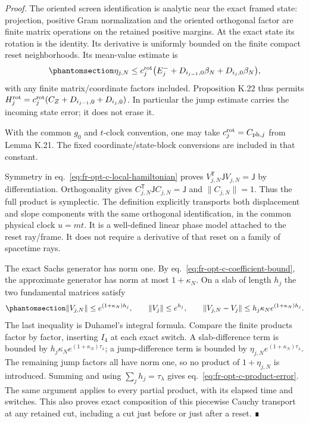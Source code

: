 \documentclass[
  english,
  11pt,
  reqno]{amsart}
\begin{document}
\emph{Proof.} The oriented screen identification is analytic near the
exact framed state: projection, positive Gram normalization and the
oriented orthogonal factor are finite matrix operations on the retained
positive margins. At the exact state its rotation is the identity. Its
derivative is uniformly bounded on the finite compact reset
neighborhoods. Its mean-value estimate is
\begin{equation}\protect\phantomsection\label{eq:fr-opt-c-rotation-input-error}{
 \eta_{j,N}\le c_j^{\rm rot}
    \bigl(E_j^-+D_{i_{j-1},0}\beta_N+D_{i_j,0}\beta_N\bigr),
}\end{equation} with any finite matrix/coordinate factors included.
Proposition K.22 thus permits
\(H_j^{\rm rot}=c_j^{\rm rot}(C_Z+D_{i_{j-1},0}+D_{i_j,0})\). In
particular the jump estimate carries the incoming state error; it does
not erase it.

With the common \(g_0\) and \(t\)-clock convention, one may take
\(c_j^{\rm rot}=C_{{\rm ph},j}\) from Lemma K.21. The fixed
coordinate/state-block conversions are included in that constant.

Symmetry in eq.~\ref{eq:fr-opt-c-local-hamiltonian} proves
\(V_{j,N}^{\mathsf T}\mathsf JV_{j,N}=\mathsf J\) by differentiation.
Orthogonality gives \(C_{j,N}^{\mathsf T}\mathsf JC_{j,N}=\mathsf J\)
and \(\|C_{j,N}\|=1\). Thus the full product is symplectic. The
definition explicitly transports both displacement and slope components
with the same orthogonal identification, in the common physical clock
\(u=mt\). It is a well-defined linear phase model attached to the reset
ray/frame. It does not require a derivative of that reset on a family of
spacetime rays.

The exact Sachs generator has norm one. By
eq.~\ref{eq:fr-opt-c-coefficient-bound}, the approximate generator has
norm at most \(1+\kappa_N\). On a slab of length \(h_j\) the two
fundamental matrices satisfy
\begin{equation}\protect\phantomsection\label{eq:fr-opt-c-slab-matrix-error}{
 \|V_{j,N}\|\le e^{(1+\kappa_N)h_j},\qquad
 \|V_j\|\le e^{h_j},\qquad
 \|V_{j,N}-V_j\|\le h_j\kappa_N e^{(1+\kappa_N)h_j}.
}\end{equation} The last inequality is Duhamel's integral formula.
Compare the finite products factor by factor, inserting \(I_4\) at each
exact switch. A slab-difference term is bounded by
\(h_j\kappa_N e^{(1+\kappa_N)\tau_\lambda}\); a jump-difference term is
bounded by \(\eta_{j,N}e^{(1+\kappa_N)\tau_\lambda}\). The remaining
jump factors all have norm one, so no product of \(1+\eta_{j,N}\) is
introduced. Summing and using \(\sum_jh_j=\tau_\lambda\) gives
eq.~\ref{eq:fr-opt-c-product-error}. The same argument applies to every
partial product, with its elapsed time and switches. This also proves
exact composition of this piecewise Cauchy transport at any retained
cut, including a cut just before or just after a reset. ∎
\end{document}
